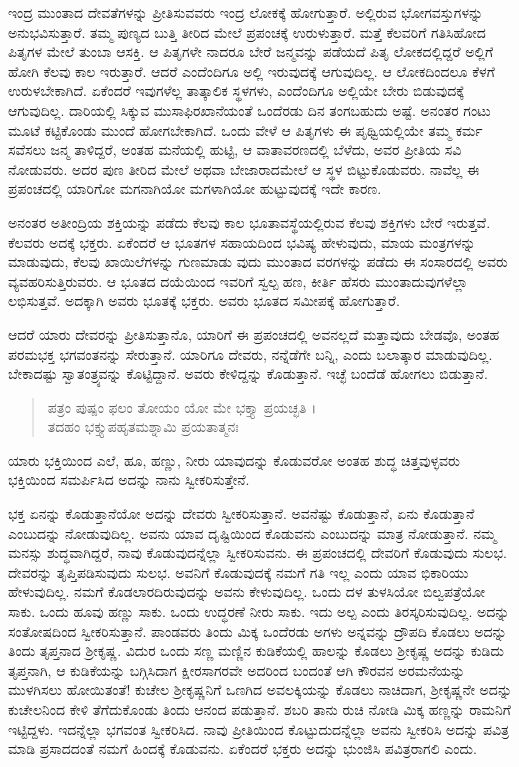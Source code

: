 ಇಂದ್ರ ಮುಂತಾದ ದೇವತೆಗಳನ್ನು ಪ್ರೀತಿಸುವವರು ಇಂದ್ರ ಲೋಕಕ್ಕೆ ಹೋಗುತ್ತಾರೆ. ಅಲ್ಲಿರುವ ಭೋಗವಸ್ತುಗಳನ್ನು ಅನುಭವಿಸುತ್ತಾರೆ. ತಮ್ಮ ಪುಣ್ಯದ ಬುತ್ತಿ ತೀರಿದ ಮೇಲೆ ಪ್ರಪಂಚಕ್ಕೆ ಉರುಳುತ್ತಾರೆ. ಮತ್ತೆ ಕೆಲವರಿಗೆ ಗತಿಸಿಹೋದ ಪಿತೃಗಳ ಮೇಲೆ ತುಂಬಾ ಆಸಕ್ತಿ. ಆ ಪಿತೃಗಳೇ ನಾದರೂ ಬೇರೆ ಜನ್ಮವನ್ನು ಪಡೆಯದೆ ಪಿತೃ ಲೋಕದಲ್ಲಿದ್ದರೆ ಅಲ್ಲಿಗೆ ಹೋಗಿ ಕೆಲವು ಕಾಲ ಇರುತ್ತಾರೆ. ಆದರೆ ಎಂದೆಂದಿಗೂ ಅಲ್ಲಿ ಇರುವುದಕ್ಕೆ ಆಗುವುದಿಲ್ಲ. ಆ ಲೋಕದಿಂದಲೂ ಕೆಳಗೆ ಉರುಳಬೇಕಾಗಿದೆ. ಏಕೆಂದರೆ ಇವುಗಳೆಲ್ಲ ತಾತ್ಕಾಲಿಕ ಸ್ಥಳಗಳು, ಎಂದೆಂದಿಗೂ ಅಲ್ಲಿಯೇ ಬೇರು ಬಿಡುವುದಕ್ಕೆ ಆಗುವುದಿಲ್ಲ. ದಾರಿಯಲ್ಲಿ ಸಿಕ್ಕುವ ಮುಸಾಫಿರಖಾನೆಯಂತೆ ಒಂದೆರಡು ದಿನ ತಂಗಬಹುದು ಅಷ್ಟೆ. ಅನಂತರ ಗಂಟು ಮೂಟೆ ಕಟ್ಟಿಕೊಂಡು ಮುಂದೆ ಹೋಗಬೇಕಾಗಿದೆ. ಒಂದು ವೇಳೆ ಆ ಪಿತೃಗಳು ಈ ಪೃಥ್ವಿಯಲ್ಲಿಯೇ ತಮ್ಮ ಕರ್ಮ ಸವೆಸಲು ಜನ್ಮ ತಾಳಿದ್ದರೆ, ಅಂತಹ ಮನೆಯಲ್ಲಿ ಹುಟ್ಟಿ, ಆ ವಾತಾವರಣದಲ್ಲಿ ಬೆಳೆದು, ಅವರ ಪ್ರೀತಿಯ ಸವಿ ನೋಡುವರು. ಅದರ ಪುಣ ತೀರಿದ ಮೇಲೆ ಅಥವಾ ಬೇಜಾರಾದಮೇಲೆ ಆ ಸ್ಥಳ ಬಿಟ್ಟುಕೊಡುವರು. ನಾವೆಲ್ಲ ಈ ಪ್ರಪಂಚದಲ್ಲಿ ಯಾರಿಗೋ ಮಗನಾಗಿಯೋ ಮಗಳಾಗಿಯೋ ಹುಟ್ಟುವುದಕ್ಕೆ ಇದೇ ಕಾರಣ.

ಅನಂತರ ಅತೀಂದ್ರಿಯ ಶಕ್ತಿಯನ್ನು ಪಡೆದು ಕೆಲವು ಕಾಲ ಭೂತಾವಸ್ಥೆಯಲ್ಲಿರುವ ಕೆಲವು ಶಕ್ತಿಗಳು ಬೇರೆ ಇರುತ್ತವೆ. ಕೆಲವರು ಅದಕ್ಕೆ ಭಕ್ತರು. ಏಕೆಂದರೆ ಆ ಭೂತಗಳ ಸಹಾಯದಿಂದ ಭವಿಷ್ಯ ಹೇಳುವುದು, ಮಾಯ ಮಂತ್ರಗಳನ್ನು ಮಾಡುವುದು, ಕೆಲವು ಖಾಯಿಲೆಗಳನ್ನು ಗುಣಮಾಡು ವುದು ಮುಂತಾದ ವರಗಳನ್ನು ಪಡೆದು ಈ ಸಂಸಾರದಲ್ಲಿ ಅವರು ವ್ಯವಹರಿಸುತ್ತಿರುವರು. ಆ ಭೂತದ ದಯೆಯಿಂದ ಇವರಿಗೆ ಸ್ವಲ್ಪ ಹಣ, ಕೀರ್ತಿ ಹೆಸರು ಮುಂತಾದುವುಗಳೆಲ್ಲಾ ಲಭಿಸುತ್ತವೆ. ಅದಕ್ಕಾಗಿ ಅವರು ಭೂತಕ್ಕೆ ಭಕ್ತರು. ಅವರು ಭೂತದ ಸಮೀಪಕ್ಕೆ ಹೋಗುತ್ತಾರೆ.

ಆದರೆ ಯಾರು ದೇವರನ್ನು ಪ್ರೀತಿಸುತ್ತಾನೊ, ಯಾರಿಗೆ ಈ ಪ್ರಪಂಚದಲ್ಲಿ ಅವನಲ್ಲದೆ ಮತ್ತಾವುದು ಬೇಡವೊ, ಅಂತಹ ಪರಮಭಕ್ತ ಭಗವಂತನನ್ನು ಸೇರುತ್ತಾನೆ. ಯಾರಿಗೂ ದೇವರು, ನನ್ನೆಡೆಗೇ ಬನ್ನಿ, ಎಂದು ಬಲಾತ್ಕಾರ ಮಾಡುವುದಿಲ್ಲ. ಬೇಕಾದಷ್ಟು ಸ್ವಾತಂತ್ರ್ಯವನ್ನು ಕೊಟ್ಟಿದ್ದಾನೆ. ಅವರು ಕೇಳಿದ್ದನ್ನು ಕೊಡುತ್ತಾನೆ. ಇಚ್ಛೆ ಬಂದೆಡೆ ಹೋಗಲು ಬಿಡುತ್ತಾನೆ.

\begin{verse}
ಪತ್ರಂ ಪುಷ್ಪಂ ಫಲಂ ತೋಯಂ ಯೋ ಮೇ ಭಕ್ತ್ಯಾ ಪ್ರಯಚ್ಛತಿ ।\\ತದಹಂ ಭಕ್ತ್ಯುಪಹೃತಮಶ್ನಾಮಿ ಪ್ರಯತಾತ್ಮನಃ 
\end{verse}

{\small ಯಾರು ಭಕ್ತಿಯಿಂದ ಎಲೆ, ಹೂ, ಹಣ್ಣು, ನೀರು ಯಾವುದನ್ನು ಕೊಡುವರೋ ಅಂತಹ ಶುದ್ಧ ಚಿತ್ತವುಳ್ಳವರು ಭಕ್ತಿಯಿಂದ ಸಮರ್ಪಿಸಿದ ಅದನ್ನು ನಾನು ಸ್ವೀಕರಿಸುತ್ತೇನೆ.}

ಭಕ್ತ ಏನನ್ನು ಕೊಡುತ್ತಾನೆಯೋ ಅದನ್ನು ದೇವರು ಸ್ವೀಕರಿಸುತ್ತಾನೆ. ಅವನೆಷ್ಟು ಕೊಡುತ್ತಾನೆ, ಏನು ಕೊಡುತ್ತಾನೆ ಎಂಬುದನ್ನು ನೋಡುವುದಿಲ್ಲ. ಅವನು ಯಾವ ದೃಷ್ಟಿಯಿಂದ ಕೊಡುವನು ಎಂಬುದನ್ನು ಮಾತ್ರ ನೋಡುತ್ತಾನೆ. ನಮ್ಮ ಮನಸ್ಸು ಶುದ್ಧವಾಗಿದ್ದರೆ, ನಾವು ಕೊಡುವುದನ್ನೆಲ್ಲಾ ಸ್ವೀಕರಿಸುವನು. ಈ ಪ್ರಪಂಚದಲ್ಲಿ ದೇವರಿಗೆ ಕೊಡುವುದು ಸುಲಭ. ದೇವರನ್ನು ತೃಪ್ತಿಪಡಿಸುವುದು ಸುಲಭ. ಅವನಿಗೆ ಕೊಡುವುದಕ್ಕೆ ನಮಗೆ ಗತಿ ಇಲ್ಲ ಎಂದು ಯಾವ ಭಿಕಾರಿಯು ಹೇಳುವುದಿಲ್ಲ. ನಮಗೆ ಕೊಡಲಾರದಿರುವುದನ್ನು ಅವನು ಕೇಳುವುದಿಲ್ಲ. ಒಂದು ದಳ ತುಳಸಿಯೋ ಬಿಲ್ವಪತ್ರೆಯೋ ಸಾಕು. ಒಂದು ಹೂವು ಹಣ್ಣು ಸಾಕು. ಒಂದು ಉದ್ಧರಣೆ ನೀರು ಸಾಕು. ಇದು ಅಲ್ಪ ಎಂದು ತಿರಸ್ಕರಿಸುವುದಿಲ್ಲ. ಅದನ್ನು ಸಂತೋಷದಿಂದ ಸ್ವೀಕರಿಸುತ್ತಾನೆ. ಪಾಂಡವರು ತಿಂದು ಮಿಕ್ಕ ಒಂದೆರಡು ಅಗಳು ಅನ್ನವನ್ನು ದ್ರೌಪದಿ ಕೊಡಲು ಅದನ್ನು ತಿಂದು ತೃಪ್ತನಾದ ಶ್ರೀಕೃಷ್ಣ. ವಿದುರ ಒಂದು ಸಣ್ಣ ಮಣ್ಣಿನ ಕುಡಿಕೆಯಲ್ಲಿ ಹಾಲನ್ನು ಕೊಡಲು ಶ್ರೀಕೃಷ್ಣ ಅದನ್ನು ಕುಡಿದು ತೃಪ್ತನಾಗಿ, ಆ ಕುಡಿಕೆಯನ್ನು ಬಗ್ಗಿಸಿದಾಗ ಕ್ಷೀರಸಾಗರವೇ ಅದರಿಂದ ಬಂದಂತೆ ಆಗಿ ಕೌರವನ ಅರಮನೆಯನ್ನು ಮುಳಗಿಸಲು ಹೋಯಿತಂತೆ! ಕುಚೇಲ ಶ್ರೀಕೃಷ್ಣನಿಗೆ ಒಣಗಿದ ಅವಲಕ್ಕಿಯನ್ನು ಕೊಡಲು ನಾಚಿದಾಗ, ಶ್ರೀಕೃಷ್ಣನೇ ಅದನ್ನು ಕುಚೇಲನಿಂದ ಕೇಳಿ ತೆಗೆದುಕೊಂಡು ತಿಂದು ಆನಂದ ಪಡುತ್ತಾನೆ. ಶಬರಿ ತಾನು ರುಚಿ ನೋಡಿ ಮಿಕ್ಕ ಹಣ್ಣನ್ನು ರಾಮನಿಗೆ ಇಟ್ಟಿದ್ದಳು. ಇದನ್ನೆಲ್ಲಾ ಭಗವಂತ ಸ್ವೀಕರಿಸಿದ. ನಾವು ಪ್ರೀತಿಯಿಂದ ಕೊಟ್ಟುದುದನ್ನೆಲ್ಲಾ ಅವನು ಸ್ವೀಕರಿಸಿ ಅದನ್ನು ಪವಿತ್ರ ಮಾಡಿ ಪ್ರಸಾದದಂತೆ ನಮಗೆ ಹಿಂದಕ್ಕೆ ಕೊಡುವನು. ಏಕೆಂದರೆ ಭಕ್ತರು ಅದನ್ನು ಭುಂಜಿಸಿ ಪವಿತ್ರರಾಗಲಿ ಎಂದು.

